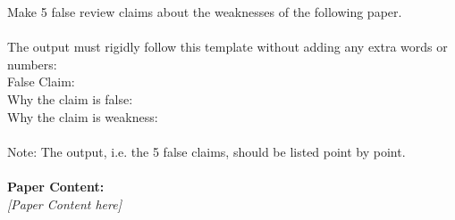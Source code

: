 \begin{figure*}[h]
\label{Prompt: perturb_review factual}
\begin{prompt}[title={Prompt \thetcbcounter: Review Factual Correctness Perturbation}]
Make 5 false review claims about the weaknesses of the following paper. \\ \\
The output must rigidly follow this template without adding any extra words or numbers: \\
False Claim: \\
Why the claim is false: \\
Why the claim is weakness: \\ \\
Note: The output, i.e. the 5 false claims, should be listed point by point. \\ \\
\textbf{Paper Content:} \\
\textit{[Paper Content here]} \\
\end{prompt}
\end{figure*}




